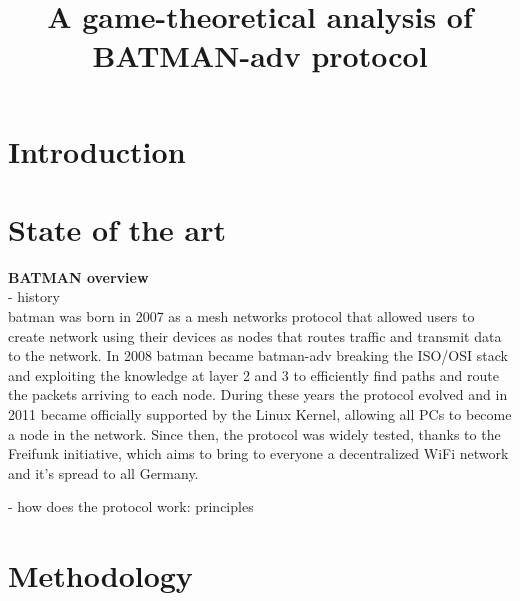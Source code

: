 \documentclass[conference]{IEEEtran}
\begin{document}
\title{A game-theoretical analysis of BATMAN-adv protocol}

\author{
\and
{}
}

\maketitle

\begin{abstract}

\end{abstract}

\section{Introduction}

\section{State of the art}

\textbf{BATMAN overview}\\

- history\\
\gls{batman} was born in 2007 as a mesh networks protocol that allowed users to create network using their devices as nodes that routes traffic and transmit data to the network. In 2008 \gls{batman} became \gls{batman}-adv breaking the ISO/OSI stack and exploiting the knowledge at layer 2 and 3 to efficiently find paths and route the packets arriving to each node. During these years the protocol evolved and in 2011 became officially supported by the Linux Kernel, allowing all PCs to become a node in the network. Since then, the protocol was widely tested, thanks to the Freifunk initiative, which aims to bring to everyone a decentralized WiFi network and it's spread to all Germany.

- how does the protocol work: principles



\section{Methodology}
\end{document}
